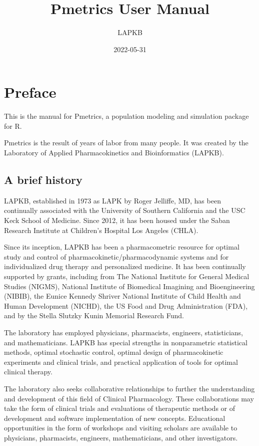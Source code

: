 \documentclass[
]{book}
\title{Pmetrics User Manual}
\author{LAPKB}
\date{2022-05-31}
\begin{document}
\maketitle

{
\setcounter{tocdepth}{1}
\tableofcontents
}
\hypertarget{preface}{%
\chapter{Preface}\label{preface}}

This is the manual for Pmetrics, a population modeling and simulation package for R.

Pmetrics is the result of years of labor from many people. It was created by the Laboratory of Applied Pharmacokinetics and Bioinformatics (LAPKB).

\hypertarget{a-brief-history}{%
\section{A brief history}\label{a-brief-history}}

LAPKB, established in 1973 as LAPK by Roger Jelliffe, MD, has been continually associated with the University of Southern California and the USC Keck School of Medicine. Since 2012, it has been housed under the Saban Research Institute at Children's Hospital Los Angeles (CHLA).

Since its inception, LAPKB has been a pharmacometric resource for optimal study and control of pharmacokinetic/pharmacodynamic systems and for individualized drug therapy and personalized medicine. It has been continually supported by grants, including from The National Institute for General Medical Studies (NIGMS), National Institute of Biomedical Imagining and Bioengineering (NIBIB), the Eunice Kennedy Shriver National Institute of Child Health and Human Development (NICHD), the US Food and Drug Administration (FDA), and by the Stella Slutzky Kunin Memorial Research Fund.

The laboratory has employed physicians, pharmacists, engineers, statisticians, and mathematicians. LAPKB has special strengths in nonparametric statistical methods, optimal stochastic control, optimal design of pharmacokinetic experiments and clinical trials, and practical application of tools for optimal clinical therapy.

The laboratory also seeks collaborative relationships to further the understanding and development of this field of Clinical Pharmacology. These collaborations may take the form of clinical trials and evaluations of therapeutic methods or of development and software implementation of new concepts. Educational opportunities in the form of workshops and visiting scholars are available to physicians, pharmacists, engineers, mathematicians, and other investigators.
\end{document}
